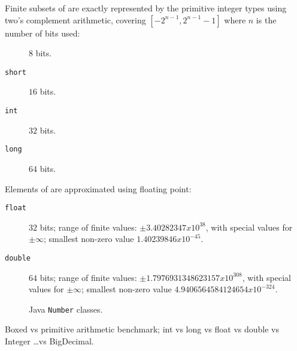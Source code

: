 \lstset{language=Java}


Finite subsets of  are exactly
represented by the primitive integer types using two's complement arithmetic, 
covering $[−2^{n−1}, 2^{n−1} − 1]$ where $n$ is the number of bits used:
\begin{description}
\item[] $8$ bits.
\item[\texttt{short}] $16$ bits.
\item[\texttt{int}] $32$ bits.
\item[\texttt{long}] $64$ bits.
\end{description}

Elements of  are approximated using floating
point:
\begin{description}
\item[\texttt{float}] $32$ bits; range of finite values:
$\pm 3.40282347 x 10^{38}$, with special values for $\pm\infty$;
smallest non-zero value $1.40239846 x 10^{-45}$.
\item[\texttt{double}] $64$ bits;
range of finite values: 
$\pm 1.7976931348623157 x 10^{308}$, with special values for $\pm\infty$;
smallest non-zero value $4.9406564584124654 x 10^{-324}$.
\end{description}


\begin{figure}[htbp]
\centering
\caption{Java \texttt{Number} classes.}
\label{fig:java-number-classes}
\end{figure}

Boxed vs primitive arithmetic benchmark; 
int vs long vs float vs double vs Integer \ldots vs BigDecimal.


\lstset{language=Clojure}

